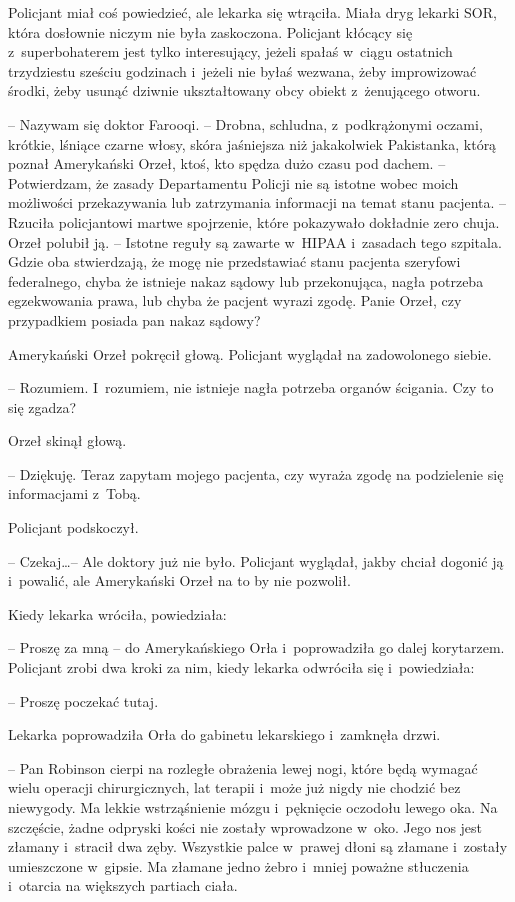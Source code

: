 \documentclass[oneside,polish,11pt,sfheadings]{mwbk}
\begin{document}
Policjant miał coś powiedzieć, ale lekarka się wtrąciła. Miała dryg
lekarki SOR, która dosłownie niczym nie była zaskoczona. Policjant
kłócący się z~superbohaterem jest tylko interesujący, jeżeli spałaś w~ciągu ostatnich trzydziestu sześciu godzinach i~jeżeli nie byłaś
wezwana, żeby improwizować środki, żeby usunąć dziwnie ukształtowany
obcy obiekt z~żenującego otworu.

-- Nazywam się doktor Farooqi. -- Drobna, schludna, z~podkrążonymi oczami,
krótkie, lśniące czarne włosy, skóra jaśniejsza niż jakakolwiek
Pakistanka, którą poznał Amerykański Orzeł, ktoś, kto spędza dużo czasu
pod dachem. -- Potwierdzam, że zasady Departamentu Policji nie są istotne
wobec moich możliwości przekazywania lub zatrzymania informacji na temat
stanu pacjenta. -- Rzuciła policjantowi martwe spojrzenie, które
pokazywało dokładnie zero chuja. Orzeł polubił ją. -- Istotne reguły są
zawarte w~HIPAA i~zasadach tego szpitala. Gdzie oba stwierdzają, że mogę
nie przedstawiać stanu pacjenta szeryfowi federalnego, chyba że istnieje
nakaz sądowy lub przekonująca, nagła potrzeba egzekwowania prawa, lub
chyba że pacjent wyrazi zgodę. Panie Orzeł, czy przypadkiem posiada pan
nakaz sądowy?

Amerykański Orzeł pokręcił głową. Policjant wyglądał na zadowolonego
siebie.

-- Rozumiem. I~rozumiem, nie istnieje nagła potrzeba organów ścigania.
Czy to się zgadza?

Orzeł skinął głową.

-- Dziękuję. Teraz zapytam mojego pacjenta, czy wyraża zgodę na
podzielenie się informacjami z~Tobą.

Policjant podskoczył. 

-- Czekaj\ldots  -- Ale doktory już nie było. Policjant
wyglądał, jakby chciał dogonić ją i~powalić, ale Amerykański Orzeł na to
by nie pozwolił.

Kiedy lekarka wróciła, powiedziała: 

-- Proszę za mną -- do Amerykańskiego
Orła i~poprowadziła go dalej korytarzem. Policjant zrobi dwa kroki za
nim, kiedy lekarka odwróciła się i~powiedziała: 

-- Proszę poczekać tutaj.

Lekarka poprowadziła Orła do gabinetu lekarskiego i~zamknęła drzwi.

-- Pan Robinson cierpi na rozległe obrażenia lewej nogi, które będą
wymagać wielu operacji chirurgicznych, lat terapii i~może już nigdy nie
chodzić bez niewygody. Ma lekkie wstrząśnienie mózgu i~pęknięcie
oczodołu lewego oka. Na szczęście, żadne odpryski kości nie zostały
wprowadzone w~oko. Jego nos jest złamany i~stracił dwa zęby. Wszystkie
palce w~prawej dłoni są złamane i~zostały umieszczone w~gipsie. Ma
złamane jedno żebro i~mniej poważne stłuczenia i~otarcia na większych
partiach ciała.
\end{document}
